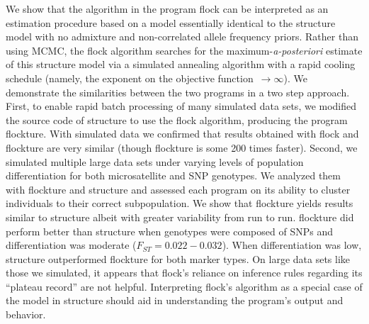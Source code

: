 
      We show that the algorithm in the program {\sc flock} \citep{Duc&Tur2009} can be
interpreted as an estimation procedure based on 
a model essentially identical to the {\sc structure} 
\citep{Pritchardetal2000} model with no admixture and non-correlated 
allele frequency priors. Rather than using MCMC, the {\sc flock} algorithm 
searches for the maximum-{\em a-posteriori}
estimate of this {\sc structure} model via a simulated 
annealing algorithm with a rapid cooling 
schedule (namely, the exponent on the objective function~$\rightarrow \infty$).  We 
demonstrate the similarities between the two programs in a two step approach. First,
to enable rapid batch processing of many simulated data sets,
we modified the source code of  {\sc structure} to use the {\sc flock} algorithm, producing
the program {\sc flockture}. With simulated data we confirmed that results obtained with
{\sc flock}  and {\sc flockture} are very similar (though flockture is some 200 times faster). 
Second, we simulated multiple large data sets under varying 
levels of population differentiation for both microsatellite and SNP genotypes. We analyzed them
with {\sc flockture} and {\sc structure} and assessed each program on its ability to cluster
individuals to their correct subpopulation.  We show that
{\sc flockture} yields results similar to {\sc structure} albeit with greater 
variability from run to run. {\sc flockture} did perform better than {\sc structure} 
when genotypes were composed of SNPs and differentiation was moderate 
($F_{ST}=0.022-0.032$). When differentiation was low, {\sc structure} outperformed {\sc flockture}
for both marker types. On large data sets like those we simulated, it appears that 
{\sc flock}'s reliance on inference rules regarding its ``plateau record'' are not helpful. 
Interpreting {\sc flock}'s algorithm as a special case of the model in 
{\sc structure} should aid in understanding the program's output and behavior. 

